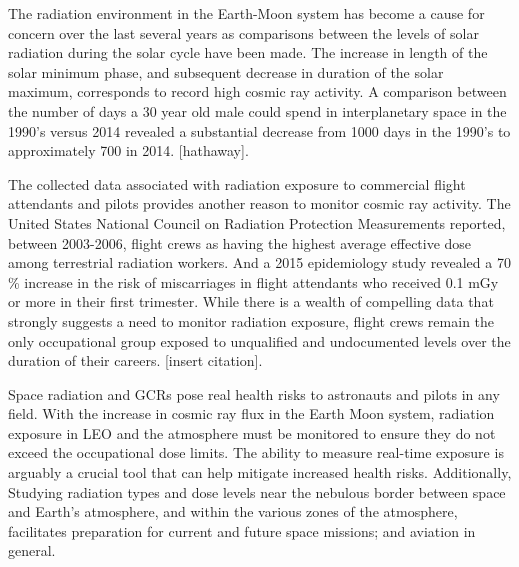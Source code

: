 


The radiation environment in the Earth-Moon system has become a cause for concern over the last several years as comparisons between the levels of solar radiation during the solar cycle have been made. The increase in length of the solar minimum phase, and subsequent decrease in duration of the solar maximum, corresponds to record high cosmic ray activity.  A comparison between the number of days a 30 year old male could spend in interplanetary space in the 1990's versus 2014 revealed a substantial decrease from 1000 days in the 1990's to approximately 700 in 2014. [hathaway].

The collected data associated with radiation exposure to commercial flight attendants and pilots provides another reason to monitor cosmic ray activity.  The United States National Council on Radiation Protection Measurements reported, between 2003-2006, flight crews as having the highest average effective dose among terrestrial radiation workers.  And a 2015 epidemiology study revealed a 70 \% increase in the risk of miscarriages in flight attendants who received 0.1 mGy or more in their first trimester.  While there is a wealth of compelling data that strongly suggests a need to monitor radiation exposure, flight crews remain the only occupational group exposed to unqualified and undocumented levels over the duration of their careers. [insert citation].     

Space radiation and GCRs pose real health risks to astronauts and  pilots in any field.  With the increase in cosmic ray flux in the Earth Moon system, radiation exposure in LEO and the atmosphere must be monitored to ensure they do not exceed the occupational dose limits.  The ability to measure real-time exposure is arguably a crucial tool that can help mitigate increased health risks.  Additionally, Studying radiation types and dose levels near the nebulous border between space and Earth's atmosphere, and within the various zones of the atmosphere, facilitates preparation for current and future space missions; and aviation in general. 

%



